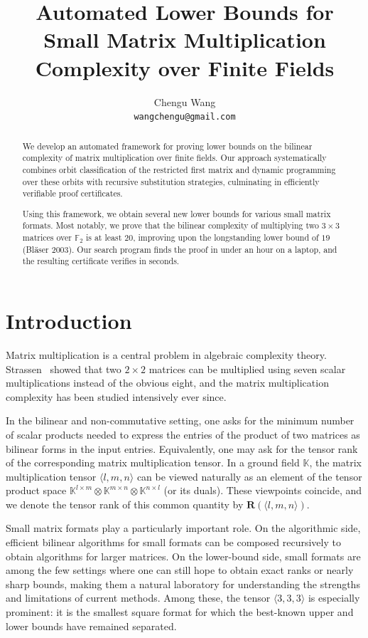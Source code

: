 \documentclass[11pt]{article}
\title{Automated Lower Bounds for Small Matrix Multiplication Complexity over Finite Fields}
\author{Chengu Wang\\ \texttt{wangchengu@gmail.com}}
\date{}
\begin{document}
\maketitle

\begin{abstract}
  We develop an automated framework for proving lower bounds on the bilinear complexity of matrix multiplication over finite fields. Our approach systematically combines orbit classification of the restricted first matrix and dynamic programming over these orbits with recursive substitution strategies, culminating in efficiently verifiable proof certificates.

  Using this framework, we obtain several new lower bounds for various small matrix formats. Most notably, we prove that the bilinear complexity of multiplying two $3 \times 3$ matrices over $\mathbb{F}_2$ is at least $20$, improving upon the longstanding lower bound of $19$ (Bl{\"a}ser 2003). Our search program finds the proof in under an hour on a laptop, and the resulting certificate verifies in seconds.
\end{abstract}

\section{Introduction}

Matrix multiplication is a central problem in algebraic complexity theory.
Strassen~\cite{strassen1969gaussian} showed that two $2\times 2$ matrices can be multiplied using seven scalar multiplications instead of the obvious eight, and the matrix multiplication complexity has been studied intensively ever since.

In the bilinear and non-commutative setting, one asks for the minimum number of scalar products needed to express the entries of the product of two matrices as bilinear forms in the input entries.
Equivalently, one may ask for the tensor rank of the corresponding matrix multiplication tensor.
In a ground field $\mathbb{K}$, the matrix multiplication tensor $\langle l,m,n\rangle$ can be viewed naturally as an element of the tensor product space $\mathbb{K}^{l\times m} \otimes \mathbb{K}^{m\times n} \otimes \mathbb{K}^{n\times l}$ (or its duals). These viewpoints coincide, and we denote the tensor rank of this common quantity by $\mathbf{R}(\langle l,m,n\rangle)$.

Small matrix formats play a particularly important role. On the algorithmic side, efficient bilinear algorithms for small formats can be composed recursively to obtain algorithms for larger matrices.
On the lower-bound side, small formats are among the few settings where one can still hope to obtain exact ranks or nearly sharp bounds, making them a natural laboratory for understanding the strengths and limitations of current methods.
Among these, the tensor $\langle 3,3,3\rangle$ is especially prominent: it is the smallest square format for which the best-known upper and lower bounds have remained separated.
\end{document}
